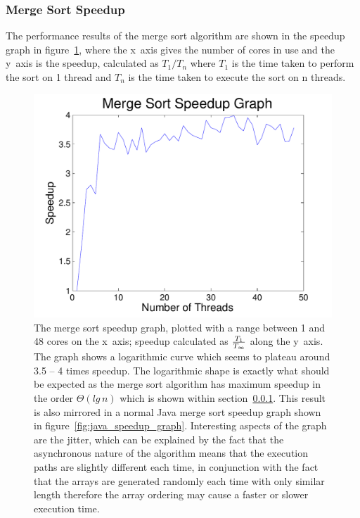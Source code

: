 \documentclass[12pt,twoside,notitlepage]{report}
\begin{document}
\subsubsection{Merge Sort Speedup}
\label{subsec:merge_sort_performance_analysis}
The performance results of the merge sort algorithm are shown in the speedup graph in figure~\ref{fig:msort_speedup_graph}, where the x~axis gives the number of cores in use and the y~axis is the speedup, calculated as
$T_1 / T_n$ where $T_1$ is the time taken to perform the sort on 1 thread and $T_n$ is the time taken to execute the sort on n threads.
\begin{figure}[h!]
\includegraphics[width=\linewidth]{msort_speedup_graph}
\caption[Parallel Merge Sort Speedup Graph]{The merge sort speedup graph, plotted with a range between 1 and 48 cores on the x~axis; speedup calculated as $T_{1} \over T_{\infty}$ along the y~axis. The graph shows a logarithmic curve which seems to plateau around 3.5
-- 4 times speedup. The logarithmic shape is exactly what should be expected as the merge sort algorithm has maximum speedup in the order $\Theta(lg\,n)$ which is shown within section~\ref{subsec:merge_sort_performance_analysis}.
This result is also mirrored in a normal Java merge sort speedup graph shown in figure~\ref{fig:java_speedup_graph}. Interesting aspects of the graph are the jitter, which can be explained by the fact that the asynchronous nature of
the algorithm means that the execution paths are slightly different each time, in conjunction with the fact that the arrays are generated randomly each time with only similar length therefore the array ordering may cause a faster or
slower execution time.}
\label{fig:msort_speedup_graph}
\end{figure}
\end{document}
